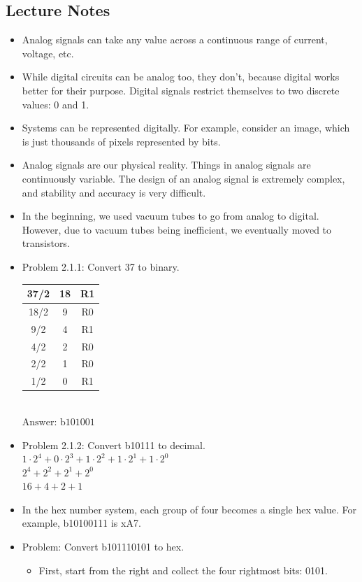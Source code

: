 \documentclass[10pt,a4paper]{article}
\newcommand{\answer}[1]{\boxed{\text{Answer: #1}}}
\begin{document}
\subsection{Lecture Notes}
\begin{itemize}
\item Analog signals can take any value across a continuous range of current, voltage, etc. 
\item While digital circuits can be analog too, they don't, because digital works better for their purpose. Digital signals restrict themselves to two discrete values: 0 and 1. 
\item Systems can be represented digitally. For example, consider an image, which is just thousands of pixels represented by bits.
\item Analog signals are our physical reality. Things in analog signals are continuously variable. The design of an analog signal is extremely complex, and stability and accuracy is very difficult. 
\item In the beginning, we used vacuum tubes to go from analog to digital. However, due to vacuum tubes being inefficient, we eventually moved to transistors. 
\item Problem 2.1.1: Convert 37 to binary.\\
\begin{tabular}{|c|c|c|}
\hline 
37/2 & 18 & R1 \\ 
\hline 
18/2 & 9 & R0 \\ 
\hline 
9/2 & 4 & R1 \\ 
\hline 
4/2 & 2 & R0 \\ 
\hline 
2/2 & 1 & R0 \\ 
\hline 
1/2 & 0 & R1 \\ 
\hline 
\end{tabular}\\
$\boxed{\text{Answer: b101001}}$ 
\item Problem 2.1.2: Convert b10111 to decimal.\\
$1\cdot2^4+0\cdot2^3+1\cdot2^2+1\cdot2^1+1\cdot2^0$\\
$2^4+2^2+2^1+2^0$\\
$16+4+2+1$\\
\answer{23}
\item In the hex number system, each group of four becomes a single hex value. For example, b10100111 is xA7. 
\item Problem: Convert b101110101 to hex.
\begin{itemize}
\item First, start from the right and collect the four rightmost bits: 0101.

\end{itemize}
\end{itemize}
\end{document}
